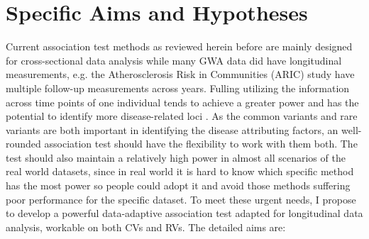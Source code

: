 \documentclass[12pt]{article}
\begin{document}
\section{Specific Aims and Hypotheses}\label{sec:aims}
Current association test methods as reviewed herein before are mainly designed for cross-sectional data analysis while many GWA data did have longitudinal measurements, e.g. the Atherosclerosis Risk in Communities (ARIC) study \cite{Chambless1997} have multiple follow-up measurements across years. Fulling utilizing the information across time points of one individual tends to achieve a greater power and has the potential to identify more disease-related loci \cite{Furlotte2012,Xu2014}. As the common variants and rare variants are both important in identifying the disease attributing factors, an well-rounded association test should have the flexibility to work with them both. The test should also maintain a relatively high power in almost all scenarios of the real world datasets, since in real world it is hard to know which specific method has the most power so people could adopt it and avoid those methods suffering poor performance for the specific dataset. To meet these urgent needs, I propose to develop a powerful data-adaptive association test adapted for longitudinal data analysis, workable on both CVs and RVs. The detailed aims are:
\end{document}
